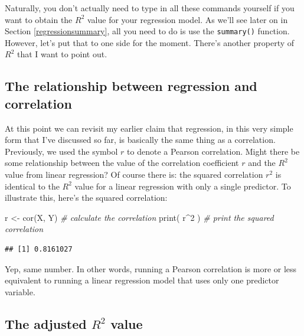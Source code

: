\documentclass[
]{book}
\newenvironment{Shaded}{\begin{snugshade}}{\end{snugshade}}
\newcommand{\CommentTok}[1]{\textcolor[rgb]{0.56,0.35,0.01}{\textit{#1}}}
\newcommand{\DecValTok}[1]{\textcolor[rgb]{0.00,0.00,0.81}{#1}}
\newcommand{\FunctionTok}[1]{\textcolor[rgb]{0.00,0.00,0.00}{#1}}
\newcommand{\NormalTok}[1]{#1}
\newcommand{\OtherTok}[1]{\textcolor[rgb]{0.56,0.35,0.01}{#1}}
\newcommand{\SpecialCharTok}[1]{\textcolor[rgb]{0.00,0.00,0.00}{#1}}
\begin{document}
Naturally, you don't actually need to type in all these commands yourself if you want to obtain the \(R^2\) value for your regression model. As we'll see later on in Section \ref{regressionsummary}, all you need to do is use the \texttt{summary()} function. However, let's put that to one side for the moment. There's another property of \(R^2\) that I want to point out.

\hypertarget{the-relationship-between-regression-and-correlation}{%
\subsection{The relationship between regression and correlation}\label{the-relationship-between-regression-and-correlation}}

At this point we can revisit my earlier claim that regression, in this very simple form that I've discussed so far, is basically the same thing as a correlation. Previously, we used the symbol \(r\) to denote a Pearson correlation. Might there be some relationship between the value of the correlation coefficient \(r\) and the \(R^2\) value from linear regression? Of course there is: the squared correlation \(r^2\) is identical to the \(R^2\) value for a linear regression with only a single predictor. To illustrate this, here's the squared correlation:

\begin{Shaded}
\begin{Highlighting}[]
\NormalTok{r }\OtherTok{\textless{}{-}} \FunctionTok{cor}\NormalTok{(X, Y)  }\CommentTok{\# calculate the correlation}
\FunctionTok{print}\NormalTok{( r}\SpecialCharTok{\^{}}\DecValTok{2}\NormalTok{ )    }\CommentTok{\# print the squared correlation}
\end{Highlighting}
\end{Shaded}

\begin{verbatim}
## [1] 0.8161027
\end{verbatim}

Yep, same number. In other words, running a Pearson correlation is more or less equivalent to running a linear regression model that uses only one predictor variable.

\hypertarget{the-adjusted-r2-value}{%
\subsection{\texorpdfstring{The adjusted \(R^2\) value}{The adjusted R\^{}2 value}}\label{the-adjusted-r2-value}}
\end{document}
